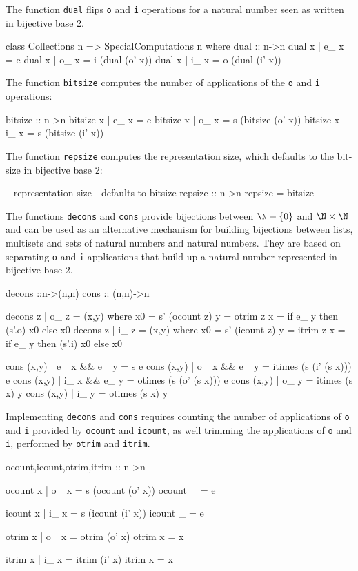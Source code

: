 \documentclass{TOOLS/llncs}
\begin{document}
The function {\tt dual} flips {\tt o} and {\tt i} operations
for a natural number seen as written in bijective base 2. 
\begin{code}
class Collections n => SpecialComputations n where
  dual :: n->n
  dual x | e_ x = e
  dual x | o_ x = i (dual (o' x))
  dual x | i_ x = o (dual (i' x))
\end{code}
The function {\tt bitsize} computes  the number of applications of the 
{\tt o} and {\tt i} operations:
\begin{code}    
  bitsize :: n->n
  bitsize x | e_ x = e
  bitsize x | o_ x = s (bitsize (o' x))
  bitsize x | i_ x = s (bitsize (i' x))
\end{code}
The function {\tt repsize} computes the representation size, which defaults to
the bit-size in bijective base 2: 
\begin{code}  
  -- representation size - defaults to bitsize
  repsize :: n->n
  repsize = bitsize
\end{code}
The functions {\tt decons} and {\tt cons} provide bijections
between $\N-\{0\}$ and $\N \times \N$ and can be used as
an alternative mechanism for building bijections
between lists, multisets and sets of natural numbers and natural numbers.
They are based on separating {\tt o} and {\tt i} applications
that build up a natural number represented in bijective base 2.
\begin{code}
  decons ::n->(n,n)
  cons :: (n,n)->n
   
  decons z | o_ z = (x,y) where
    x0 = s' (ocount z)
    y = otrim z
    x = if e_ y then (s'.o) x0 else x0 
  decons z | i_ z = (x,y) where
    x0 = s' (icount z)
    y = itrim z
    x = if e_ y then (s'.i) x0 else x0 
    
  cons (x,y) | e_ x && e_ y = s e
  cons (x,y) | o_ x && e_ y = itimes (s (i' (s x))) e
  cons (x,y) | i_ x && e_ y = otimes (s (o' (s x))) e
  cons (x,y) | o_ y = itimes (s x) y
  cons (x,y) | i_ y = otimes (s x) y
\end{code}
Implementing {\tt decons} and {\tt cons} requires
counting the number of applications of {\tt o} and {\tt i}
provided by {\tt ocount} and {\tt icount}, as well trimming
the applications of {\tt o} and {\tt i}, performed
by {\tt otrim} and {\tt itrim}.
\begin{code}    
  ocount,icount,otrim,itrim :: n->n
  
  ocount x | o_ x = s (ocount (o' x))
  ocount _ = e
  
  icount x | i_ x = s (icount (i' x))
  icount _ = e
  
  otrim x | o_ x = otrim (o' x)
  otrim x = x
  
  itrim x | i_ x = itrim (i' x)
  itrim x = x
\end{code}
\end{document}
